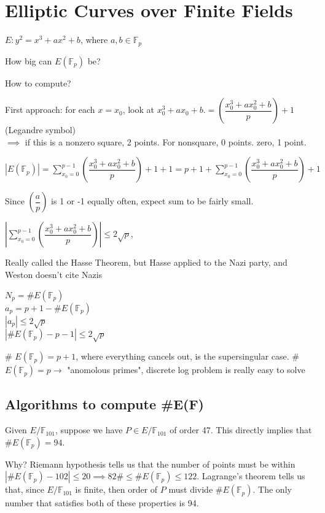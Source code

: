 \documentclass[twoside, 10pt]{article}
\newcommand{\F}{\mathbb{F}}
\begin{document}
\section{Elliptic Curves over Finite Fields}
$E : y^2 = x^3 + ax^2 + b$, where $a, b \in \F_p$

How big can $E(\F_p)$ be? 

How to compute?

First approach: for each $x = x_0$, look at $x_0^3 + ax_0 + b$.$= \left(\dfrac{x_0^3 + ax_0^2 + b}{p}\right) + 1$ (Legandre symbol)\\$\implies$ if this is a nonzero square, 2 points. For nonsquare, 0 points. zero, 1 point. 

$|E(\F_p)| = \sum\limits_{x_0=0}^{p-1}\left(\dfrac{x_0^3 + ax_0^2 + b}{p}\right) + 1 + 1 = p + 1 + \sum\limits_{x_0=0}^{p-1}\left(\dfrac{x_0^3 + ax_0^2 + b}{p}\right)+ 1$ 

Since $\left(\dfrac{a}{p}\right)$ is 1 or -1 equally often, expect sum to be fairly small.
\begin{thm}
    $|\sum\limits_{x_0=0}^{p-1}\left(\dfrac{x_0^3 + ax_0^2 + b}{p}\right)| \leq 2\sqrt p$, 
\end{thm}
Really called the Hasse Theorem, but Hasse applied to the Nazi party, and Weston doesn't cite Nazis

$N_p = \#E(\F_p)$\\
$a_p = p + 1 - \#E(\F_p)$\\
$|a_p| \leq 2\sqrt{p}$\\
$|\#E(\F_p) - p - 1| \leq 2\sqrt p$

\begin{rmk}
    \# $E(\F_p) = p + 1$, where everything cancels out, is the supersingular case.
    \# $E(\F_p) = p \to$ "anomolous primes", discrete log problem is really easy to solve %
\end{rmk}

\subsection{Algorithms to compute \#E(F)}
Given $E/\F_{101}$, suppose we have $P \in E/\F_{101}$ of order 47. This directly implies that \#$E(\F_p) = 94$.

Why? Riemann hypothesis tells us that the number of points must be within $|\#E(\F_p) - 102| \leq 20 \implies 82 \# \leq \#E(\F_p) \leq 122$. Lagrange's theorem tells us that, since $E/\F_{101}$ is finite, then order of $P$ must divide $\#E(\F_p)$. The only number that satisfies both of these properties is 94.
\end{document}
